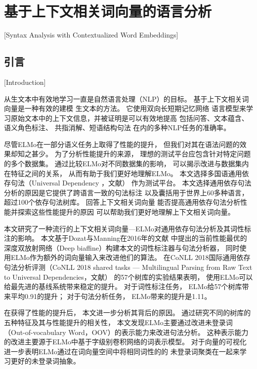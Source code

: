 
\chapter{基于上下文相关词向量的语言分析}[Syntax Analysis with Contextualized Word Embeddings]\label{chp:seqlabel}

\section{引言}[Introduction]

从生文本中有效地学习一直是自然语言处理（NLP）的目标。
基于上下文相关词向量\cite{peters-EtAl:2018:N18-1}是一种有效的建模
生文本的方法。
它使用双向长短期记忆网络\cite{Hochreiter:1997:LSM:1246443.1246450}
语言模型来学习原始文本中的上下文信息，并被证明是可以有效地提高
包括问答、文本蕴含、语义角色标注\cite{peters-EtAl:2018:N18-1}、
共指消解\cite{lee-he-zettlemoyer:2018:N18-2}、短语结构句法\cite{joshi-peters-hopkins:2018:Long}
在内的多种NLP任务的准确率\cite{peters-EtAl:2018:EMNLP}。

尽管ELMo在一部分语义任务上取得了性能的提升，
但我们对其在语法问题的效果却知之甚少。
为了分析性能提升的来源，
理想的测试平台应包含针对特定问题的多个数据集。 
通过比较ELMo对不同数据集的影响，
可以揭示改进与数据集内在特征之间的关系，
从而有助于我们更好地理解ELMo。 
本文选择多国语通用依存句法（Universal Dependency ，文献）
作为测试平台。
本文选择通用依存句法分析的原因是它提供了跨语言一致的句法标注
以及囊括用于世界上60多种语言，超过100个依存句法树库。
回答上下文相关词向量
能否提高通用依存句法分析性能并探索这些性能提升的原因
可以帮助我们更好地理解上下文相关词向量。

本文研究了一种流行的上下文相关词向量---ELMo对通用依存句法分析及其词性标注的影响。
本文基于Dozat与Manning在2016年的文献
中提出的当前性能最优的
深度双放射网络（Deep biaffine）构建本文的词性标注器与句法分析器，
同时使用ELMo作为额外的词向量输入来改进他们的算法。 
在CoNLL 2018国际通用依存句法分析评测（CoNLL 2018 shared tasks --- Multilingual Parsing from Raw Text to Universal Dependencies，文献）
的57个树库的实验结果表明，
使用ELMo可以给最先进的基线系统带来稳定的提升。
对于词性标注任务，
ELMo给57个树库带来平均0.91的提升；
对于句法分析任务，
ELMo带来的提升是1.11。

在获得了性能的提升后，
本文进一步分析其背后的原因。
通过研究不同的树库的五种特征及其与性能提升的相关性，
本文发现ELMo主要通过改进未登录词（Out-of-vocabulary Word，OOV）的表示能力来改进句法分析。
这种表示能力的改进主要源于ELMo中基于字级别卷积网络的词表示模型。
对于向量的可视化进一步表明ELMo通过在词向量空间中将相同词性的的
未登录词聚类在一起来学习更好的未登录词抽象。

